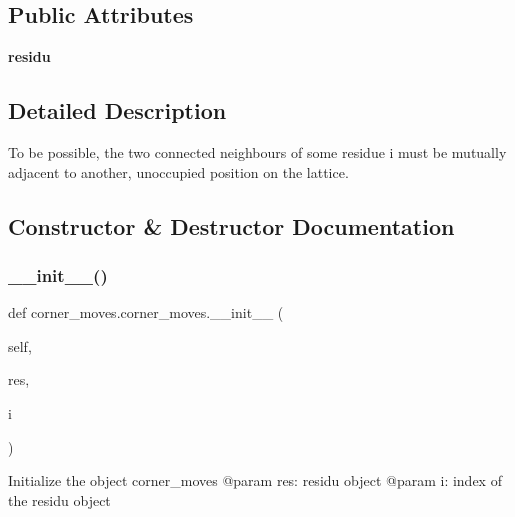 \subsection*{Public Attributes}
\begin{DoxyCompactItemize}
\item 
\mbox{\label{classcorner__moves_1_1corner__moves_aff78eb5369bc6db1648731ad805f62ba}} 
{\bfseries residu}
\end{DoxyCompactItemize}


\subsection{Detailed Description}
\begin{DoxyVerb}To be possible, the two connected neighbours of some residue i must
be mutually adjacent to another, unoccupied position on the lattice.
\end{DoxyVerb}
 

\subsection{Constructor \& Destructor Documentation}
\mbox{\label{classcorner__moves_1_1corner__moves_a71da897f349e236a2b89ce47d6f71a75}} 
\subsubsection{\texorpdfstring{\+\_\+\+\_\+init\+\_\+\+\_\+()}{\_\_init\_\_()}}
{\footnotesize\ttfamily def corner\+\_\+moves.\+corner\+\_\+moves.\+\_\+\+\_\+init\+\_\+\+\_\+ (\begin{DoxyParamCaption}\item[{}]{self,  }\item[{}]{res,  }\item[{}]{i }\end{DoxyParamCaption})}

\begin{DoxyVerb}Initialize the object corner_moves
    @param res: residu object
    @param   i: index of the residu object
\end{DoxyVerb}
 

